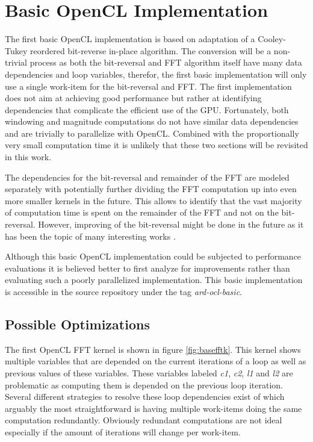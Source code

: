 \documentclass[conference]{IEEEtran}
\begin{document}
\section{Basic OpenCL Implementation}

The first basic OpenCL implementation is based on adaptation of a Cooley-Tukey
reordered bit-reverse in-place algorithm\cite{arduinofft}. The conversion will
be a non-trivial process as both the bit-reversal and FFT algorithm itself have
many data dependencies and loop variables, therefor, the first basic
implementation will only use a single work-item for the bit-reversal and FFT.
The first implementation does not aim at achieving good performance but rather
at identifying dependencies that complicate the efficient use of the GPU.
Fortunately, both windowing and magnitude computations do not have similar data
dependencies and are trivially to parallelize with OpenCL. Combined with the
proportionally very small computation time it is unlikely that these two
sections will be revisited in this work.

The dependencies for the bit-reversal and remainder of the FFT are modeled
separately with potentially further dividing the FFT computation up into even
more smaller kernels in the future. This allows to identify that the vast
majority of computation time is spent on the remainder of the FFT and not on
the bit-reversal. However, improving of the bit-reversal might be done in the
future as it has been the topic of many interesting works
\cite{Rius1995,Karp1996,parreverse,Adikaram2014}.

Although this basic OpenCL implementation could be subjected to performance
evaluations it is believed better to first analyze for improvements rather than
evaluating such a poorly parallelized implementation. This basic implementation
is accessible in the source repository under the tag \textit{ard-ocl-basic}.

\subsection{Possible Optimizations}

The first OpenCL FFT kernel is shown in figure \ref{fig:basefftk}. This kernel
shows multiple variables that are depended on the current iterations of a loop
as well as previous values of these variables. These variables labeled
\textit{c1}, \textit{c2}, \textit{l1} and \textit{l2} are problematic as
computing them is depended on the previous loop iteration. Several different 
strategies to resolve these loop dependencies exist of which arguably the most
straightforward is having multiple work-items doing the same computation
redundantly. Obviously redundant computations are not ideal especially if the
amount of iterations will change per work-item.
\end{document}
